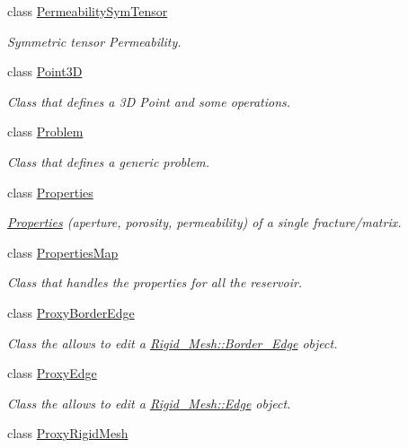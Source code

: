 \begin{DoxyCompactItemize}
class \hyperlink{classFVCode3D_1_1PermeabilitySymTensor}{Permeability\+Sym\+Tensor}
\begin{DoxyCompactList}\small\item\em Symmetric tensor Permeability. \end{DoxyCompactList}\item 
class \hyperlink{classFVCode3D_1_1Point3D}{Point3D}
\begin{DoxyCompactList}\small\item\em Class that defines a 3D Point and some operations. \end{DoxyCompactList}\item 
class \hyperlink{classFVCode3D_1_1Problem}{Problem}
\begin{DoxyCompactList}\small\item\em Class that defines a generic problem. \end{DoxyCompactList}\item 
class \hyperlink{classFVCode3D_1_1Properties}{Properties}
\begin{DoxyCompactList}\small\item\em \hyperlink{classFVCode3D_1_1Properties}{Properties} (aperture, porosity, permeability) of a single fracture/matrix. \end{DoxyCompactList}\item 
class \hyperlink{classFVCode3D_1_1PropertiesMap}{Properties\+Map}
\begin{DoxyCompactList}\small\item\em Class that handles the properties for all the reservoir. \end{DoxyCompactList}\item 
class \hyperlink{classFVCode3D_1_1ProxyBorderEdge}{Proxy\+Border\+Edge}
\begin{DoxyCompactList}\small\item\em Class the allows to edit a \hyperlink{classFVCode3D_1_1Rigid__Mesh_1_1Border__Edge}{Rigid\+\_\+\+Mesh\+::\+Border\+\_\+\+Edge} object. \end{DoxyCompactList}\item 
class \hyperlink{classFVCode3D_1_1ProxyEdge}{Proxy\+Edge}
\begin{DoxyCompactList}\small\item\em Class the allows to edit a \hyperlink{classFVCode3D_1_1Rigid__Mesh_1_1Edge}{Rigid\+\_\+\+Mesh\+::\+Edge} object. \end{DoxyCompactList}\item 
class \hyperlink{classFVCode3D_1_1ProxyRigidMesh}{Proxy\+Rigid\+Mesh}

\end{DoxyCompactItemize}
